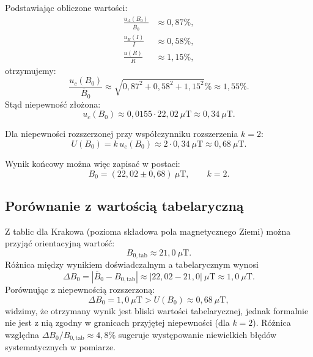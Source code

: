\documentclass{fizykalab}
\begin{document}
Podstawiając obliczone wartości:
\begin{align}
  \frac{u_A(B_0)}{\overline{B}_0}
  &\approx 0{,}87\%, \\
  \frac{u_B(I)}{I}
  &\approx 0{,}58\%, \\
  \frac{u(R)}{R}
  &\approx 1{,}15\%,
\end{align}
otrzymujemy:
\begin{equation}
  \frac{u_c(B_0)}{\overline{B}_0}
  \approx
  \sqrt{
    0{,}87^2 + 0{,}58^2 + 1{,}15^2
  }\%
  \approx 1{,}55\%.
\end{equation}
Stąd niepewność złożona:
\begin{equation}
  u_c(B_0) \approx
  0{,}0155 \cdot 22{,}02~\mu\text{T}
  \approx 0{,}34~\mu\text{T}.
\end{equation}

Dla niepewności rozszerzonej przy współczynniku rozszerzenia
\(k = 2\):
\begin{equation}
  U(B_0) = k\,u_c(B_0)
  \approx 2\cdot 0{,}34~\mu\text{T}
  \approx 0{,}68~\mu\text{T}.
\end{equation}

Wynik końcowy można więc zapisać w postaci:
\begin{equation}
  B_0 = (22{,}02 \pm 0{,}68)~\mu\text{T},
  \qquad k = 2.
\end{equation}

\subsection{Porównanie z wartością tabelaryczną}

Z tablic dla Krakowa (pozioma składowa pola magnetycznego
Ziemi) można przyjąć orientacyjną wartość:
\begin{equation}
  B_{0,\text{tab}} \approx 21{,}0~\mu\text{T}.
\end{equation}
Różnica między wynikiem doświadczalnym a tabelarycznym wynosi
\begin{equation}
  \Delta B_0 =
  \left|\overline{B}_0 - B_{0,\text{tab}}\right|
  \approx |22{,}02 - 21{,}0|~\mu\text{T}
  \approx 1{,}0~\mu\text{T}.
\end{equation}
Porównując z niepewnością rozszerzoną:
\begin{equation}
  \Delta B_0 = 1{,}0~\mu\text{T} >
  U(B_0) \approx 0{,}68~\mu\text{T},
\end{equation}
widzimy, że otrzymany wynik jest bliski wartości tabelarycznej,
jednak formalnie nie jest z nią zgodny w granicach przyjętej
niepewności (dla \(k = 2\)). Różnica względna
\(\Delta B_0 / B_{0,\text{tab}} \approx 4{,}8\%\) sugeruje
występowanie niewielkich błędów systematycznych w pomiarze.
\end{document}
